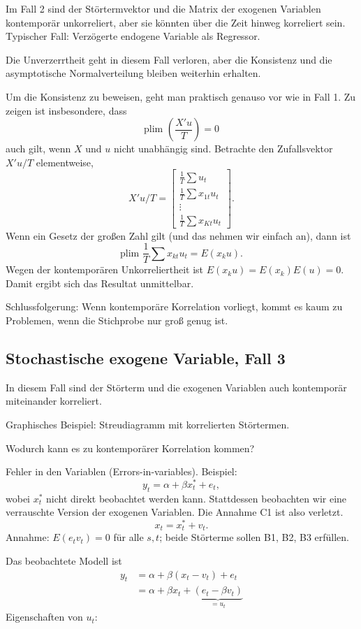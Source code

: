 \documentclass{article}
\begin{document}
Im Fall 2 sind der Störtermvektor und die Matrix der exogenen Variablen
kontemporär unkorreliert, aber sie könnten über die Zeit hinweg
korreliert sein. Typischer Fall: Verzögerte endogene Variable als Regressor.

Die Unverzerrtheit geht in diesem Fall verloren, aber die Konsistenz und
die asymptotische Normalverteilung bleiben weiterhin erhalten.

Um die Konsistenz zu beweisen, geht man praktisch genauso vor wie in
Fall 1. Zu zeigen ist insbesondere, dass
\[ \textrm{plim }\left( \frac{X'u}{T}\right) =0 \]
auch gilt, wenn $X$ und $u$ nicht unabhängig sind. Betrachte den
Zufallsvektor $X'u/T$ elementweise,
\[ X'u/T=\left[ 
\begin{array}{c}
\frac{1}{T}\sum u_{t} \\ 
\frac{1}{T}\sum x_{1t}u_{t} \\ 
\vdots \\ 
\frac{1}{T}\sum x_{Kt}u_{t}
\end{array}
\right]. \]
Wenn ein Gesetz der großen Zahl gilt (und das nehmen wir einfach an), dann ist
\[ \textrm{plim }\frac{1}{T}\sum x_{kt}u_{t}=E(x_{k}u). \]
Wegen der kontemporären Unkorreliertheit ist $E(x_{k}u)=E(x_{k})E(u)=0$.
Damit ergibt sich das Resultat unmittelbar.

Schlussfolgerung: Wenn kontemporäre Korrelation vorliegt, kommt es kaum
zu Problemen, wenn die Stichprobe nur groß genug ist.

\subsection*{Stochastische exogene Variable, Fall 3}

In diesem Fall sind der Störterm und die exogenen Variablen auch 
kontemporär miteinander korreliert.

Graphisches Beispiel: Streudiagramm mit korrelierten Störtermen.

Wodurch kann es zu kontemporärer Korrelation kommen?

Fehler in den Variablen (Errors-in-variables). Beispiel: 
\[ y_{t}=\alpha +\beta x_{t}^{\ast }+e_{t}, \]
wobei $x_{t}^{\ast }$ nicht direkt beobachtet werden kann. Stattdessen
beobachten wir eine verrauschte Version der exogenen Variablen.
Die Annahme C1 ist also verletzt.
\[ x_{t}=x_{t}^{\ast }+v_{t}. \]
Annahme: $E(e_{t}v_{t})=0$ für alle $s,t$; beide Störterme sollen
B1, B2, B3 erfüllen.

Das beobachtete Modell ist
\begin{align*}
y_{t} &=\alpha +\beta \left( x_{t}-v_{t}\right) +e_{t} \\
&=\alpha +\beta x_{t}+\underbrace{\left( e_{t}-\beta v_{t}\right) }_{=u_{t}}
\end{align*}
Eigenschaften von $u_{t}$: 
\end{document}
